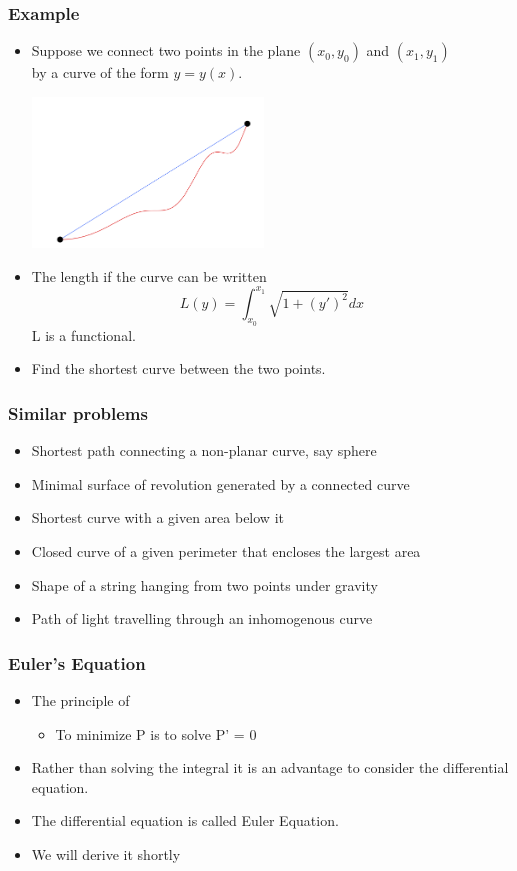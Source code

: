\documentclass[10pt]{beamer}
\begin{document}
\begin{frame}
  \frametitle{Example}
  \begin{itemize}
  \item Suppose we connect two points in the plane $(x_0, y_0)$ and
    $(x_1, y_1)$ \\by a curve of the form $y = y(x)$.

    \centerline{\includegraphics[height=4cm]{basic-curve}}

  \item The length if the curve can be written
    \[ L(y) = \int_{x_0}^{x_1} \sqrt{1 + {(y')}^2} dx \]
    L is a functional. 
  \item Find the shortest curve between the two points. 
  \end{itemize}
\end{frame}

\begin{frame}
  \frametitle{Similar problems}
  \begin{itemize}
  \item Shortest path connecting a non-planar curve, say sphere
  \item Minimal surface of revolution generated by a connected curve
  \item Shortest curve with a given area below it
  \item Closed curve of a given perimeter that encloses the largest area
  \item Shape of a string hanging from two points under gravity
  \item Path of light travelling through an inhomogenous curve
  \end{itemize}
\end{frame}


\begin{frame}
  \frametitle{Euler's Equation}
  \begin{itemize}
  \item The principle of 
    \begin{itemize}
    \item To minimize P is to solve P' = 0
    \end{itemize}
  \item Rather than solving the integral it is an advantage to
    consider the differential equation. 
  \item The differential equation is called Euler Equation. 
  \item We will derive it shortly
  \end{itemize}
\end{frame}
\end{document}
